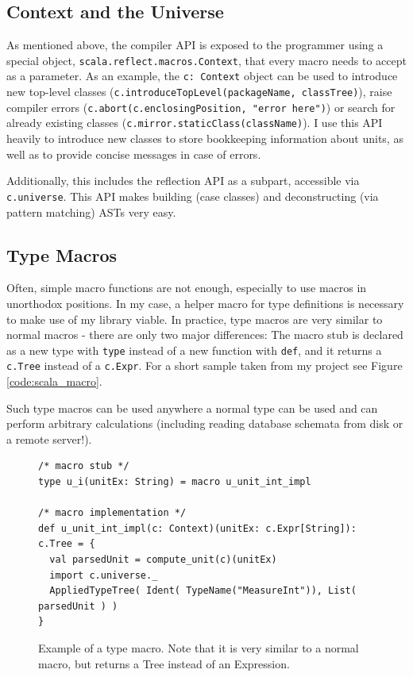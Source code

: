 \documentclass[12pt,oneside,a4paper]{scrbook}
\theoremstyle{definition}
\begin{document}
\subsection{Context and the Universe}

As mentioned above, the compiler API is exposed to the programmer using a special object, \verb|scala.reflect.macros.Context|, that every macro needs to accept as a parameter. As an example, the \verb|c: Context| object can be used to introduce new top-level classes (\verb|c.introduceTopLevel(packageName, classTree)|), raise compiler errors (\verb|c.abort(c.enclosingPosition, "error here")|) or search for already existing classes (\verb|c.mirror.staticClass(className)|). I use this API heavily to introduce new classes to store bookkeeping information about units, as well as to provide concise messages in case of errors.

Additionally, this includes the reflection API as a subpart, accessible via \verb|c.universe|. This API makes building (case classes) and deconstructing (via pattern matching) ASTs very easy.

\subsection{Type Macros}

Often, simple macro functions are not enough, especially to use macros in unorthodox positions. In my case, a helper macro for type definitions is necessary to make use of my library viable. In practice, type macros are very similar to normal macros - there are only two major differences: The macro stub is declared as a new type with \verb|type| instead of a new function with \verb|def|, and it returns a \verb|c.Tree| instead of a \verb|c.Expr|. For a short sample taken from my project see Figure \ref{code:scala_macro}.

Such type macros can be used anywhere a normal type can be used and can perform arbitrary calculations (including reading database schemata from disk or a remote server!).

\begin{figure}
\begin{verbatim}
/* macro stub */
type u_i(unitEx: String) = macro u_unit_int_impl

/* macro implementation */
def u_unit_int_impl(c: Context)(unitEx: c.Expr[String]): c.Tree = {
  val parsedUnit = compute_unit(c)(unitEx)
  import c.universe._
  AppliedTypeTree( Ident( TypeName("MeasureInt")), List( parsedUnit ) )
}
\end{verbatim}
\caption{Example of a type macro. Note that it is very similar to a normal macro, but returns a Tree instead of an Expression.}
\label{code:scala_typemacro}
\end{figure}
\end{document}
